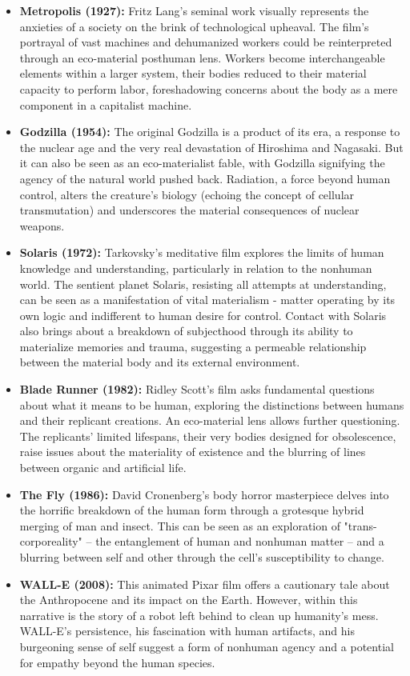 \documentclass[11pt,fleqn]{book}
\begin{document}
\begin{itemize}
\item \textbf{Metropolis (1927):} Fritz Lang's seminal work visually represents the anxieties of a society on the brink of technological upheaval. The film's portrayal of vast machines and dehumanized workers could be reinterpreted through an eco-material posthuman lens. Workers become interchangeable elements within a larger system, their bodies reduced to their material capacity to perform labor, foreshadowing concerns about the body as a mere component in a capitalist machine.

\item \textbf{Godzilla (1954):} The original Godzilla is a product of its era, a response to the nuclear age and the very real devastation of Hiroshima and Nagasaki. But it can also be seen as an eco-materialist fable, with Godzilla signifying the agency of the natural world pushed back. Radiation, a force beyond human control, alters the creature's biology (echoing the concept of cellular transmutation) and underscores the material consequences of nuclear weapons.

\item \textbf{Solaris (1972):} Tarkovsky's meditative film explores the limits of human knowledge and understanding, particularly in relation to the nonhuman world. The sentient planet Solaris, resisting all attempts at understanding, can be seen as a manifestation of vital materialism - matter operating by its own logic and indifferent to human desire for control. Contact with Solaris also brings about a breakdown of subjecthood through its ability to materialize memories and trauma, suggesting a permeable relationship between the material body and its external environment.

\item \textbf{Blade Runner (1982):} Ridley Scott's film asks fundamental questions about what it means to be human, exploring the distinctions between humans and their replicant creations. An eco-material lens allows further questioning. The replicants' limited lifespans, their very bodies designed for obsolescence, raise issues about the materiality of existence and the blurring of lines between organic and artificial life.  

\item \textbf{The Fly (1986):}  David Cronenberg's body horror masterpiece delves into the horrific breakdown of the human form through a grotesque hybrid merging of man and insect. This can be seen as an exploration of "trans-corporeality" – the entanglement of human and nonhuman matter – and a blurring between self and other through the cell's susceptibility to change.

\item \textbf{WALL-E (2008):} This animated Pixar film offers a cautionary tale about the Anthropocene and its impact on the Earth. However, within this narrative is the story of a robot left behind to clean up humanity's mess. WALL-E's persistence, his fascination with human artifacts, and his burgeoning sense of self suggest a form of nonhuman agency and a potential for empathy beyond the human species. 
\end{itemize}
\end{document}

